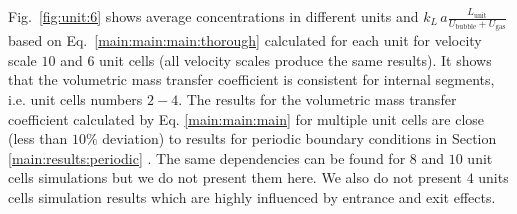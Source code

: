 \documentclass[preprint,12pt]{elsarticle}
\newcommand{\beq}{\begin{equation}}
\newcommand{\feq}{\end{equation}}
\newcommand{\beqal}{\begin{equation}\begin{aligned}}
\newcommand{\feqal}{\end{aligned}\end{equation}}
\newcommand{\vol}{k_L\,a}
\newcommand{\lunit}{L_{\mathrm{unit}}}
\newcommand{\ububble}{U_{\mathrm{bubble}}}
\newcommand{\uliq}{U_{\mathrm{liq}}}
\newcommand{\ugas}{U_{\mathrm{gas}}}
\newcommand{\cstar}{C^{*}}
\newcommand{\volnondim}{\vol \frac{\lunit}{\ububble+\ugas}}
\begin{document}
Fig.~\ref{fig:unit:6} shows average concentrations in different units and $\volnondim$ based on
Eq.~\ref{main:main:main:thorough} calculated for each unit for velocity
scale $10$ and  $6$ unit cells (all velocity scales produce the same results). It shows that the
volumetric mass transfer coefficient is consistent for internal segments, i.e.
unit cells numbers $2-4$.  The results for the volumetric mass transfer
coefficient calculated by Eq. \ref{main:main:main} for multiple unit cells are
close (less than $10\%$ deviation) to results for periodic boundary conditions in Section
\ref{main:results:periodic} . 
The same dependencies
can be found for
$8$ and $10$ unit cells simulations but we do not present them here. We also do not present $4$
units cells simulation results which are highly influenced by entrance and exit effects.
\end{document}
